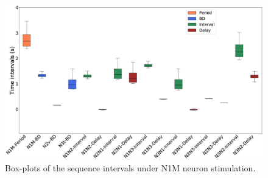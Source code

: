\begin{figure}[h!]
    \centering
\includegraphics[width=\textwidth]{img/results-paper-modelo/figure5.eps}
\caption{Box-plots of the  sequence intervals under N1M neuron stimulation.}
\label{fig:invariant n1m boxplot}
\end{figure}
\clearpage
\newpage

